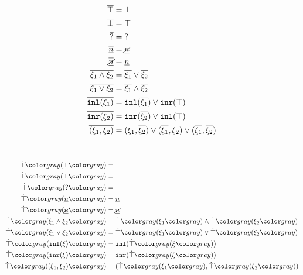 ~~
\begin{subequations}\label{defn:dual}
\begin{align}
  \cdual{\ctruth} &= \cfalsity \\
  \cdual{\cfalsity} &= \ctruth \\
  \cdual{\cunknown} &= \cunknown \\
  \cdual{\cnum{n}} &= \cnotnum{n} \\
  \cdual{\cnotnum{n}} &= \cnum{n} \\
  \cdual{\cand{\xi_1}{\xi_2}} &= \cor{\cdual{\xi_1}}{\cdual{\xi_2}} \\
  \cdual{\cor{\xi_1}{\xi_2}} &= \cand{\cdual{\xi_1}}{\cdual{\xi_2}} \\
  \cdual{\cinl{\xi_1}} &= \cor{ \cinl{\cdual{\xi_1}} }{ \cinr{\ctruth} } \\
  \cdual{\cinr{\xi_2}} &= \cor{ \cinr{\cdual{\xi_2}} }{ \cinl{\ctruth} } \\
  \cdual{\cpair{\xi_1}{\xi_2}} &=
  \cor{ \cor{ 
    \cpair{\xi_1}{\cdual{\xi_2}}
  }{
    \cpair{\cdual{\xi_1}}{\xi_2}
  }}{
    \cpair{\cdual{\xi_1}}{\cdual{\xi_2}}
  }
\end{align}
\end{subequations}

~~
\begin{subequations}\label{defn:truify}
\begin{align}
  \ctruify{\ctruth} &= \ctruth \\
  \ctruify{\cfalsity} &= \cfalsity \\
  \ctruify{\cunknown} &= \ctruth \\
  \ctruify{\cnum{n}} &= \cnum{n} \\
  \ctruify{\cnotnum{n}} &= \cnotnum{n} \\
  \ctruify{\cand{\xi_1}{\xi_2}} &= \cand{\ctruify{\xi_1}}{\ctruify{\xi_2}} \\
  \ctruify{\cor{\xi_1}{\xi_2}} &= \cor{\ctruify{\xi_1}}{\ctruify{\xi_2}} \\
  \ctruify{\cinl{\xi}} &= \cinl{\ctruify{\xi}} \\
  \ctruify{\cinr{\xi}} &= \cinr{\ctruify{\xi}} \\
  \ctruify{\cpair{\xi_1}{\xi_2}} &= \cpair{\ctruify{\xi_1}}{\ctruify{\xi_2}}
\end{align}
\end{subequations}

